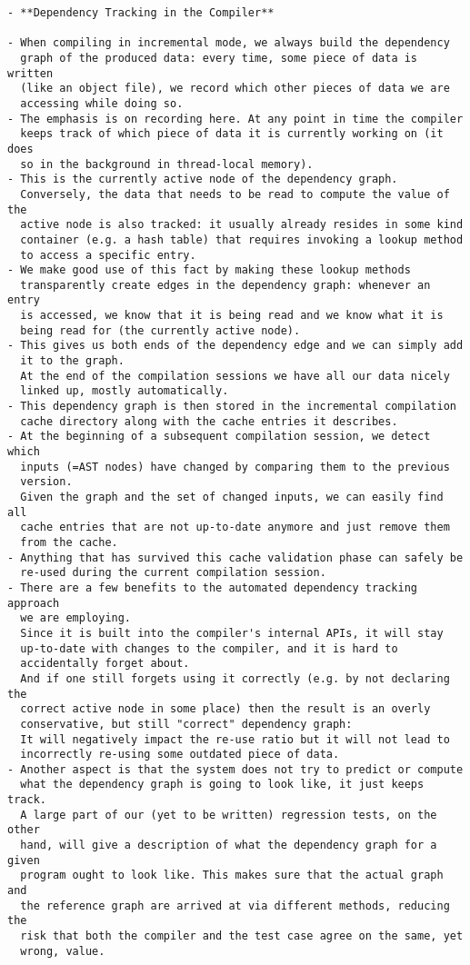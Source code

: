 \documentclass[12pt, a4paper]{report}
\begin{document}
\begin{verbatim}
- **Dependency Tracking in the Compiler**

- When compiling in incremental mode, we always build the dependency
  graph of the produced data: every time, some piece of data is written
  (like an object file), we record which other pieces of data we are
  accessing while doing so.
- The emphasis is on recording here. At any point in time the compiler
  keeps track of which piece of data it is currently working on (it does
  so in the background in thread-local memory).
- This is the currently active node of the dependency graph.
  Conversely, the data that needs to be read to compute the value of the
  active node is also tracked: it usually already resides in some kind
  container (e.g. a hash table) that requires invoking a lookup method
  to access a specific entry.
- We make good use of this fact by making these lookup methods
  transparently create edges in the dependency graph: whenever an entry
  is accessed, we know that it is being read and we know what it is
  being read for (the currently active node).
- This gives us both ends of the dependency edge and we can simply add
  it to the graph.
  At the end of the compilation sessions we have all our data nicely
  linked up, mostly automatically.
- This dependency graph is then stored in the incremental compilation
  cache directory along with the cache entries it describes.
- At the beginning of a subsequent compilation session, we detect which
  inputs (=AST nodes) have changed by comparing them to the previous
  version.
  Given the graph and the set of changed inputs, we can easily find all
  cache entries that are not up-to-date anymore and just remove them
  from the cache.
- Anything that has survived this cache validation phase can safely be
  re-used during the current compilation session.
- There are a few benefits to the automated dependency tracking approach
  we are employing.
  Since it is built into the compiler's internal APIs, it will stay
  up-to-date with changes to the compiler, and it is hard to
  accidentally forget about.
  And if one still forgets using it correctly (e.g. by not declaring the
  correct active node in some place) then the result is an overly
  conservative, but still "correct" dependency graph:
  It will negatively impact the re-use ratio but it will not lead to
  incorrectly re-using some outdated piece of data.
- Another aspect is that the system does not try to predict or compute
  what the dependency graph is going to look like, it just keeps track.
  A large part of our (yet to be written) regression tests, on the other
  hand, will give a description of what the dependency graph for a given
  program ought to look like. This makes sure that the actual graph and
  the reference graph are arrived at via different methods, reducing the
  risk that both the compiler and the test case agree on the same, yet
  wrong, value.
\end{verbatim}
\end{document}
